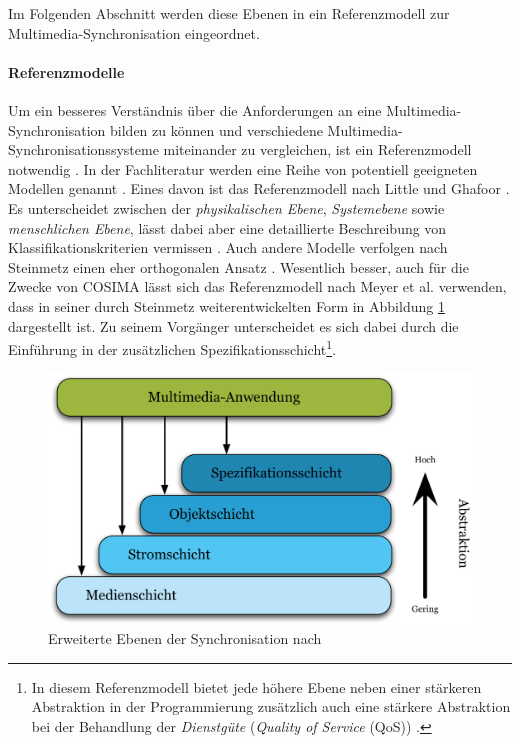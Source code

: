   Im Folgenden Abschnitt werden diese Ebenen in ein Referenzmodell zur Multimedia-Synchronisation eingeordnet.


\paragraph{Referenzmodelle} %
\label{par:referenzmodelle}

  Um ein besseres Verständnis über die Anforderungen an eine Multi\-media-Synchronisation bilden zu können und verschiedene Multimedia-Synchronisations\-systeme miteinander zu vergleichen, ist ein Referenzmodell notwendig \citep[S. 601]{multimedia_technologie}. In der Fachliteratur werden eine Reihe von potentiell geeigneten Modellen genannt \citep[S. 601]{multimedia_technologie}. Eines davon ist das Referenzmodell nach Little und Ghafoor \citep{little1991ms}. Es unterscheidet zwischen der \emph{physikalischen Ebene}, \emph{Systemebene} sowie \emph{menschlichen Ebene}, lässt dabei aber eine detaillierte Beschreibung von Klassifikationskriterien vermissen \citep[S. 601]{multimedia_technologie}. Auch andere Modelle verfolgen nach Steinmetz einen eher orthogonalen Ansatz \citep[S. 601]{multimedia_technologie}. Wesentlich besser, auch für die Zwecke von COSIMA lässt sich das Referenzmodell nach Meyer et al. \citep{meyer1993tms} verwenden, dass in seiner durch Steinmetz weiterentwickelten Form \citep{steinmetz1995mcc} in Abbildung \ref{fig:images_Erweiterte_Synchronisations-Ebenen} dargestellt ist. Zu seinem Vorgänger unterscheidet es sich dabei durch die Einführung in der zusätzlichen Spezifikationsschicht\footnote{In diesem Referenzmodell bietet jede höhere Ebene neben einer stärkeren Abstraktion in der Programmierung zusätzlich auch eine stärkere Abstraktion bei der Behandlung der \emph{Dienstgüte} (\emph{Quality of Service} (QoS)) \citep[S. 601]{steinmetz1995mcc}.}.

  \begin{figure}[!ht]
    \centering
      \includegraphics[width=.9\textwidth]{images/Erweiterte_Synchronisations-Ebenen.pdf}
    \caption{Erweiterte Ebenen der Synchronisation nach \citep[S. 601]{steinmetz1995mcc}}
    \label{fig:images_Erweiterte_Synchronisations-Ebenen}
  \end{figure}
  
